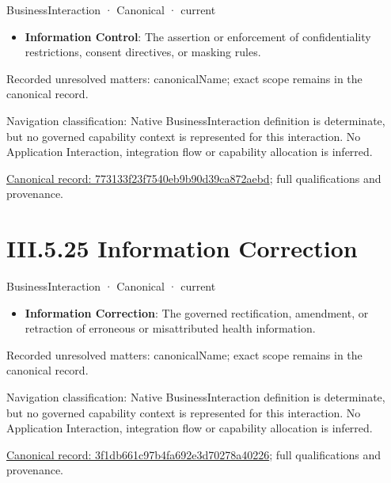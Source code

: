 \label{element:773133f23f7540eb9b90d39ca872aebd}
{\small BusinessInteraction · Canonical · current}\par

\begin{itemize}


\item \textbf{Information Control}: The assertion or enforcement of confidentiality restrictions, consent directives, or masking rules.

\end{itemize}

{\small Recorded unresolved matters: canonicalName; exact scope remains in the canonical record.}\par
{\small Navigation classification: Native BusinessInteraction definition is determinate, but no governed capability context is represented for this interaction. No Application Interaction, integration flow or capability allocation is inferred.}\par
{\footnotesize \href{../../../../../../../continuum/business/business-interaction/773133f23f7540eb9b90d39ca872aebd.md}{Canonical record: 773133f23f7540eb9b90d39ca872aebd}; full qualifications and provenance.}\par
\section*{III.5.25 Information Correction}
\label{navigation:III.5.25}

\label{element:3f1db661c97b4fa692e3d70278a40226}
{\small BusinessInteraction · Canonical · current}\par

\begin{itemize}


\item \textbf{Information Correction}: The governed rectification, amendment, or retraction of erroneous or misattributed health information.

\end{itemize}

{\small Recorded unresolved matters: canonicalName; exact scope remains in the canonical record.}\par
{\small Navigation classification: Native BusinessInteraction definition is determinate, but no governed capability context is represented for this interaction. No Application Interaction, integration flow or capability allocation is inferred.}\par
{\footnotesize \href{../../../../../../../continuum/business/business-interaction/3f1db661c97b4fa692e3d70278a40226.md}{Canonical record: 3f1db661c97b4fa692e3d70278a40226}; full qualifications and provenance.}\par
